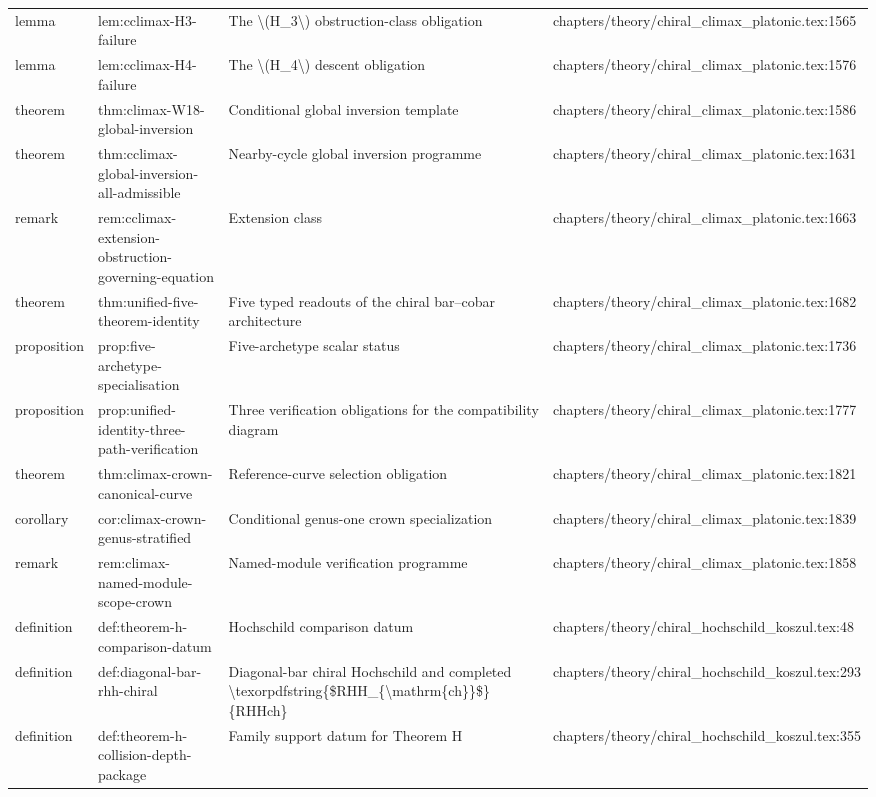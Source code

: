 \documentclass[11pt]{article}
\begin{document}
\begin{longtable}{L{0.10\textwidth}L{0.26\textwidth}L{0.42\textwidth}L{0.22\textwidth}}
lemma & lem:cclimax-H3-failure & The \textbackslash{}(H\_3\textbackslash{}) obstruction-class obligation & chapters/theory/chiral\_climax\_platonic.tex:1565\\
lemma & lem:cclimax-H4-failure & The \textbackslash{}(H\_4\textbackslash{}) descent obligation & chapters/theory/chiral\_climax\_platonic.tex:1576\\
theorem & thm:climax-W18-global-inversion & Cond{}itional global inversion template & chapters/theory/chiral\_climax\_platonic.tex:1586\\
theorem & thm:cclimax-global-inversion-all-admissible & Nearby-cycle global inversion programme & chapters/theory/chiral\_climax\_platonic.tex:1631\\
remark & rem:cclimax-extension-obstruction-governing-equation & Extension class & chapters/theory/chiral\_climax\_platonic.tex:1663\\
theorem & thm:unified-five-theorem-identity & Five typed readouts of the chiral bar--cobar architecture & chapters/theory/chiral\_climax\_platonic.tex:1682\\
proposition & prop:five-archetype-specialisation & Five-archetype scalar stat{}us & chapters/theory/chiral\_climax\_platonic.tex:1736\\
proposition & prop:unified-identity-three-path-verification & Three verification obligations for the compatibility diagram & chapters/theory/chiral\_climax\_platonic.tex:1777\\
theorem & thm:climax-crown-canonical-curve & Reference-curve selection obligation & chapters/theory/chiral\_climax\_platonic.tex:1821\\
corollary & cor:climax-crown-genus-stratified & Cond{}itional genus-one crown specialization & chapters/theory/chiral\_climax\_platonic.tex:1839\\
remark & rem:climax-named-module-scope-crown & Named-module verification programme & chapters/theory/chiral\_climax\_platonic.tex:1858\\
definition & def:theorem-h-comparison-datum & Hochschild comparison datum & chapters/theory/chiral\_hochschild\_koszul.tex:48\\
definition & def:diagonal-bar-rhh-chiral & Diagonal-bar chiral Hochschild and completed \textbackslash{}texorpdfstring\{\$RHH\_\{\textbackslash{}mathrm\{ch\}\}\$\}\{RHHch\} & chapters/theory/chiral\_hochschild\_koszul.tex:293\\
definition & def:theorem-h-collision-depth-package & Family support datum for Theorem H & chapters/theory/chiral\_hochschild\_koszul.tex:355\\

\end{longtable}
\end{document}
